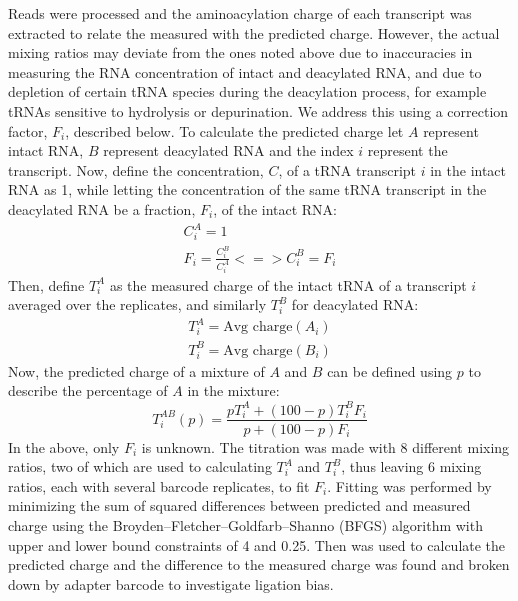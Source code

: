 \documentclass[9pt,lineno]{elife}
\begin{document}
Reads were processed and the aminoacylation charge of each transcript was extracted to relate the measured with the predicted charge.
However, the actual mixing ratios may deviate from the ones noted above due to inaccuracies in measuring the RNA concentration of intact and deacylated RNA, and due to depletion of certain tRNA species during the deacylation process, for example tRNAs sensitive to hydrolysis or depurination.
We address this using a correction factor, $F_i$, described below.
To calculate the predicted charge let $A$ represent intact RNA, $B$ represent deacylated RNA and the index $i$ represent the transcript.
Now, define the concentration, $C$, of a tRNA transcript $i$ in the intact RNA as 1, while letting the concentration of the same tRNA transcript in the deacylated RNA be a fraction, $F_i$, of the intact RNA:
\begin{equation}
\begin{split}
C^A_i = 1 \\
F_i = \frac{C^B_i}{C^A_i} <=> C^B_i = F_i
\end{split}
\end{equation}
Then, define $T^A_i$ as the measured charge of the intact tRNA of a transcript $i$ averaged over the replicates, and similarly $T^B_i$ for deacylated RNA:
\begin{equation}
\begin{split}
T^A_i = \text{Avg charge}(A_i) \\
T^B_i = \text{Avg charge}(B_i)
\end{split}
\end{equation}
Now, the predicted charge of a mixture of $A$ and $B$ can be defined using $p$ to describe the percentage of $A$ in the mixture:
\begin{equation}
\label{eq:pred_charge}
T^{AB}_i(p) = \frac{p T^A_i + (100-p) T^B_i F_i}{p + (100-p) F_i}
\end{equation}
In the above, only $F_i$ is unknown.
The titration was made with 8 different mixing ratios, two of which are used to calculating $T^A_i$ and $T^B_i$, thus leaving 6 mixing ratios, each with several barcode replicates, to fit $F_i$.
Fitting was performed by minimizing the sum of squared differences between predicted and measured charge using the Broyden–Fletcher–Goldfarb–Shanno (BFGS) algorithm with upper and lower bound constraints of 4 and 0.25.
Then  was used to calculate the predicted charge and the difference to the measured charge was found and broken down by adapter barcode to investigate ligation bias.
\end{document}
